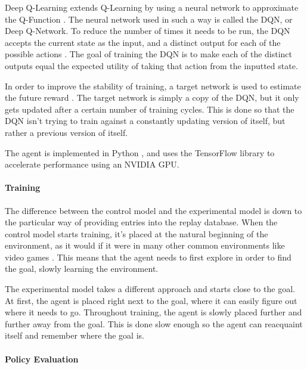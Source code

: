 \documentclass[12pt]{article}
\begin{document}
Deep Q-Learning extends Q-Learning by using a neural network to approximate the Q-Function \cite{article_human_level_control_deep_reinforcement_learning}.
The neural network used in such a way is called the DQN, or Deep Q-Network.
To reduce the number of times it needs to be run, the DQN accepts the current state as the input, and a distinct output for each of the possible actions \cite{article_reinforcement_learning_survey}.
The goal of training the DQN is to make each of the distinct outputs equal the expected utility of taking that action from the inputted state.

In order to improve the stability of training, a target network is used to estimate the future reward \cite{article_human_level_control_deep_reinforcement_learning}.
The target network is simply a copy of the DQN, but it only gets updated after a certain number of training cycles.
This is done so that the DQN isn't trying to train against a constantly updating version of itself, but rather a previous version of itself.

The agent is implemented in Python \cite{lang_python}, and uses the TensorFlow \cite{lib_tensorflow} library to accelerate performance using an NVIDIA GPU.


\paragraph{Training} 
The difference between the control model and the experimental model is down to the particular way of providing entries into the replay database.
When the control model starts training, it's placed at the natural beginning of the environment, as it would if it were in many other common environments like video games \cite{article_reinforcement_learning_survey}.
This means that the agent needs to first explore in order to find the goal, slowly learning the environment.

The experimental model takes a different approach and starts close to the goal.
At first, the agent is placed right next to the goal, where it can easily figure out where it needs to go.
Throughout training, the agent is slowly placed further and further away from the goal.
This is done slow enough so the agent can reacquaint itself and remember where the goal is.

\paragraph{Policy Evaluation}
\end{document}
